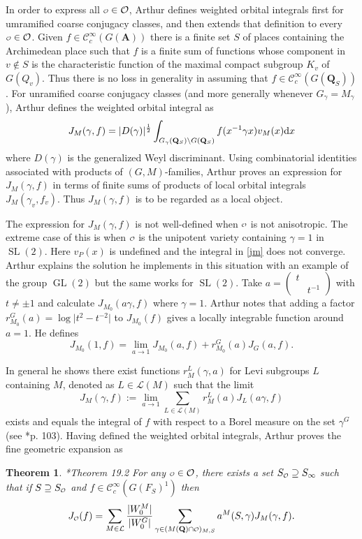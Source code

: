 \documentclass[11pt]{amsart}
\def\A{\mathbf A}
\def\Q{\mathbf Q}
\def\CCC{\mathcal C}
\def\LLL{\mathcal L}
\def\O{\mathcal O}
\def\o{\scalebox{0.8}{$\scriptstyle\mathcal{O}$}}
\def\cb#1{{\color{black}#1}}
\def\d{\text d}
\def\bs{\setminus} 			%
\def\gl{\operatorname{GL}}
\def\mod#1{\lvert #1 \rvert} %
\def\sl{\operatorname{SL}}
\newtheorem{theorem}{Theorem}[section]
\theoremstyle{remark}
\begin{document}
In order to express all $\o \in \O$, Arthur defines weighted orbital integrals first for umramified coarse conjugacy classes, and then extends that definition to every $\o \in \O$. Given $f \in \CCC_c^\infty(G(\A))$ there is a finite set $S$ of places containing the Archimedean place such that $f$ is a finite sum of functions whose component in $v \not \in S$ is the characteristic function of the maximal compact subgroup $K_v$ of $G(Q_v)$. Thus there is no loss in generality in assuming that $f \in \CCC_c^\infty(G(\Q_S))$. For unramified coarse conjugacy classes (and more generally whenever $G_\gamma = M_\gamma$), Arthur defines the weighted orbital integral as 
\begin{equation} \label{jm}
	J_M(\gamma, f) = \mod{D(\gamma)}^{\frac{1}{2}} \int_{G_\gamma(\Q_S)\bs G(\Q_S)} f(x^{-1}\gamma x) v_M(x) \d x
\end{equation}
where $D(\gamma)$ is the generalized Weyl discriminant. Using combinatorial identities associated with products of $(G, M)$-families, Arthur proves an expression for $J_M(\gamma, f)$ in terms of finite sums of products of local orbital integrals $J_M(\gamma_v, f_v)$. Thus $J_M(\gamma, f)$ is to be regarded as a local object. 

The expression for $J_M(\gamma, f)$ is not well-defined when $\o$ is not anisotropic. The extreme case of this is when $\o$ is the unipotent variety containing $\gamma = 1$ in $\sl(2)$. Here $v_P(x)$ is undefined and the integral in \cref{jm} does not converge. Arthur explains the solution he implements in this situation with an example of the group $\gl(2)$ but the same works for $\sl(2)$. \cb{Take $a = \begin{pmatrix} t & \\ & t^{-1} \end{pmatrix}$ with $t \neq \pm 1$ and calculate $J_{M_0}(a\gamma, f)$ where $\gamma = 1$. Arthur notes that adding a factor $r_{M_0}^G(a) = \log \mod{t^2 - t^{-2}}$ to $J_{M_0}(f)$ gives a locally integrable function around $a=1$. He defines
\[ J_{M_0}(1, f) = \lim_{a \to 1} J_{M_0}(a, f) + r_{M_0}^G(a) J_G(a, f). \]
}

In general he shows there exist functions $r_M^L(\gamma, a)$ for Levi subgroups $L$ containing $M$, denoted as $L \in \LLL(M)$ such that the limit
\[ J_M(\gamma, f) := \lim_{a \to 1} \sum_{L \in \LLL(M)} r_M^L(a) J_L(a\gamma, f) \]
exists and equals the integral of $f$ with respect to a Borel measure on the set $\gamma^G$ (see \cite{clay}*{p. 103}). Having defined the weighted orbital integrals, Arthur proves the fine geometric expansion as
\begin{theorem} \cite{clay}*{Theorem 19.2}
	For any $\o \in \O$, there exists a set $S_{\o} \supseteq S_\infty$ such that if $S \supseteq S_{\o}$ and $f \in \CCC_c^\infty(G(F_S)^1)$ then
	\[ J_{\o}(f) = \sum_{M \in \LLL} \frac{\mod{W_0^M}}{\mod{W_0^G}} \sum_{\gamma \in (M(\Q)\cap \o)_{M, S}}
			a^M(S, \gamma) J_M(\gamma, f). \]
\end{theorem}
\end{document}
